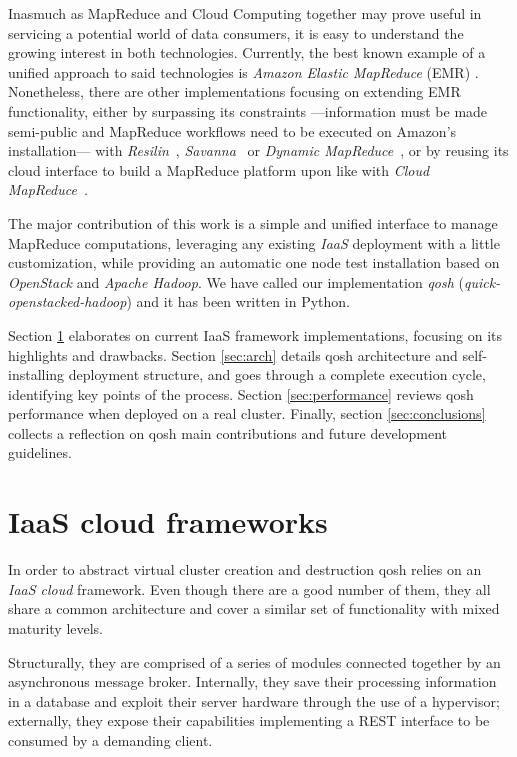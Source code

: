 \documentclass[conference]{IEEEtran}
\begin{document}
Inasmuch as MapReduce and Cloud Computing together may prove useful in servicing a potential world of data consumers, it is easy to understand the growing interest in both technologies. Currently, the best known example of a unified approach to said technologies is \emph{Amazon Elastic MapReduce} (EMR) \cite{emr:2013:online}. Nonetheless, there are other implementations focusing on extending EMR functionality, either by surpassing its constraints ---information must be made semi-public and MapReduce workflows need to be executed on Amazon's installation--- with \emph{Resilin}~\cite{resilin}, \emph{Savanna}~\cite{savanna:2013:online} or \emph{Dynamic MapReduce}~\cite{dynamicmapreduce}, or by reusing its cloud interface to build a MapReduce platform upon like with \emph{Cloud MapReduce}~\cite{cloudmapreduce}.

The major contribution of this work is a simple and unified interface to manage MapReduce computations, leveraging any existing \emph{IaaS} deployment with a little customization, while providing an automatic one node test installation based on \emph{OpenStack} and \emph{Apache Hadoop}. We have called our implementation \emph{qosh} (\emph{quick-openstacked-hadoop}) and it has been written in Python.

Section \ref{sec:frameworks} elaborates on current IaaS framework implementations, focusing on its highlights and drawbacks. Section \ref{sec:arch} details qosh architecture and self-installing deployment structure, and goes through a complete execution cycle, identifying key points of the process. Section \ref{sec:performance} reviews qosh performance when deployed on a real cluster. Finally, section \ref{sec:conclusions} collects a reflection on qosh main contributions and future development guidelines.



\section{IaaS cloud frameworks}\label{sec:frameworks}
\noindent In order to abstract virtual cluster creation and destruction qosh relies on an \emph{IaaS cloud} framework. Even though there are a good number of them, they all share a common architecture and cover a similar set of functionality with mixed maturity levels.
     
Structurally, they are comprised of a series of modules connected together by an asynchronous message broker. Internally, they save their processing information in a database and exploit their server hardware through the use of a hypervisor; externally, they expose their capabilities implementing a REST interface to be consumed by a demanding client.
\end{document}
